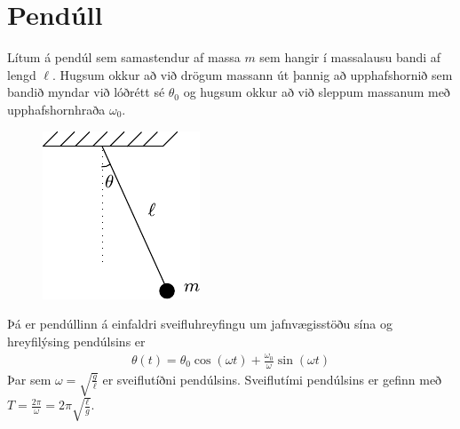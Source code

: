 \section{Pendúll}

\begin{tcolorbox}
\begin{theorem} \label{law:pendulum}
Lítum á pendúl sem samastendur af massa $m$ sem hangir í massalausu bandi af lengd $\ell$. Hugsum okkur að við drögum massann út þannig að upphafshornið sem bandið myndar við lóðrétt sé $\theta_0$ og hugsum okkur að við sleppum massanum með upphafshornhraða $\omega_0$.
\begin{figure}[H]
    \centering
    \includegraphics{figures/pendulum.pdf}
\end{figure}
Þá er pendúllinn á einfaldri sveifluhreyfingu um jafnvægisstöðu sína og hreyfilýsing pendúlsins er
\begin{align*}
    \theta(t) = \theta_0 \cos(\omega t) + \frac{\omega_0}{\omega}\sin(\omega t)
\end{align*}
Þar sem $\omega = \sqrt{\frac{g}{\ell}}$ er sveiflutíðni pendúlsins. Sveiflutími pendúlsins er gefinn með $T = \frac{2\pi}{\omega} = 2\pi \sqrt{\frac{\ell}{g}}$.
\end{theorem}
\end{tcolorbox}

